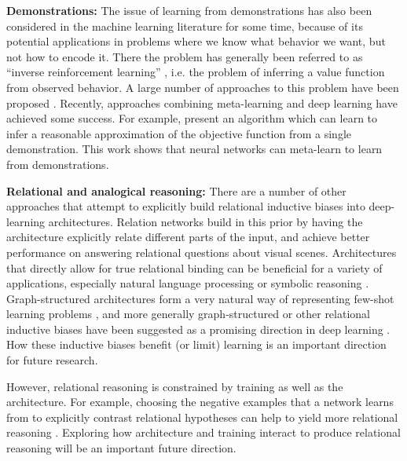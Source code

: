 \textbf{Demonstrations:} The issue of learning from demonstrations has also been considered in the machine learning literature for some time, because of its potential applications in problems where we know what behavior we want, but not how to encode it. There the problem has generally been referred to as ``inverse reinforcement learning'' \citep{Ng2000}, i.e. the problem of inferring a value function from observed behavior. A large number of approaches to this problem have been proposed \citep[e.g.][]{Ng2000, Abbeel2004}. Recently, approaches combining meta-learning and deep learning have achieved some success. For example, \citet{Finn2016} present an algorithm which can learn to infer a reasonable approximation of the objective function from a single demonstration. This work shows that neural networks can meta-learn to learn from demonstrations. \par

\textbf{Relational and analogical reasoning:} There are a number of other approaches that attempt to explicitly build relational inductive biases into deep-learning architectures. Relation networks \citep{Santoro2017} build in this prior by having the architecture explicitly relate different parts of the input, and achieve better performance on answering relational questions about visual scenes. Architectures that directly allow for true relational binding can be beneficial for a variety of applications, especially natural language processing or symbolic reasoning \citep[e.g.][]{Smolensky1990, Smolensky2014, Huang2017}. Graph-structured architectures form a very natural way of representing few-shot learning problems \citep{Garcia2018}, and more generally graph-structured or other relational inductive biases have been suggested as a promising direction in deep learning \citep{Battaglia2018}. How these inductive biases benefit (or limit) learning is an important direction for future research. \par 
However, relational reasoning is constrained by training as well as the architecture. For example, choosing the negative examples that a network learns from to explicitly contrast relational hypotheses can help to yield more relational reasoning \citep{Hill2019}. Exploring how architecture and training interact to produce relational reasoning will be an important future direction. \par

